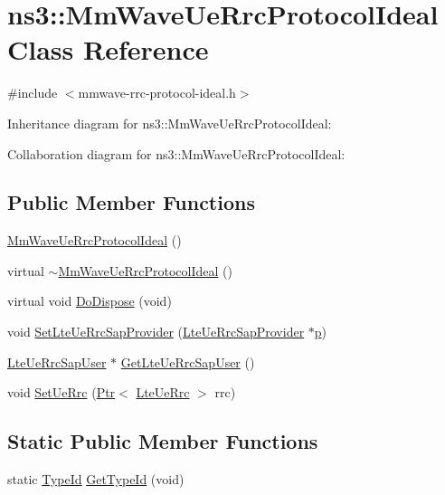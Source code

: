 \hypertarget{classns3_1_1MmWaveUeRrcProtocolIdeal}{}\section{ns3\+:\+:Mm\+Wave\+Ue\+Rrc\+Protocol\+Ideal Class Reference}
\label{classns3_1_1MmWaveUeRrcProtocolIdeal}


{\ttfamily \#include $<$mmwave-\/rrc-\/protocol-\/ideal.\+h$>$}



Inheritance diagram for ns3\+:\+:Mm\+Wave\+Ue\+Rrc\+Protocol\+Ideal\+:


Collaboration diagram for ns3\+:\+:Mm\+Wave\+Ue\+Rrc\+Protocol\+Ideal\+:
\subsection*{Public Member Functions}
\begin{DoxyCompactItemize}
\item 
\hyperlink{classns3_1_1MmWaveUeRrcProtocolIdeal_ae4988b5518f4a590e049f74e33978f2e}{Mm\+Wave\+Ue\+Rrc\+Protocol\+Ideal} ()
\item 
virtual \hyperlink{classns3_1_1MmWaveUeRrcProtocolIdeal_ade23c1f0a480c15e6c7a67045d7df137}{$\sim$\+Mm\+Wave\+Ue\+Rrc\+Protocol\+Ideal} ()
\item 
virtual void \hyperlink{classns3_1_1MmWaveUeRrcProtocolIdeal_a11bd9aac149c2f0d37e440b7628fa943}{Do\+Dispose} (void)
\item 
void \hyperlink{classns3_1_1MmWaveUeRrcProtocolIdeal_a6aed05cc60fc94e70db59b70a1a9e59e}{Set\+Lte\+Ue\+Rrc\+Sap\+Provider} (\hyperlink{classns3_1_1LteUeRrcSapProvider}{Lte\+Ue\+Rrc\+Sap\+Provider} $\ast$\hyperlink{lte__link__budget__x2__handover__measures_8m_ac9de518908a968428863f829398a4e62}{p})
\item 
\hyperlink{classns3_1_1LteUeRrcSapUser}{Lte\+Ue\+Rrc\+Sap\+User} $\ast$ \hyperlink{classns3_1_1MmWaveUeRrcProtocolIdeal_aef2a01aa68122ab82982b7ab14f01b83}{Get\+Lte\+Ue\+Rrc\+Sap\+User} ()
\item 
void \hyperlink{classns3_1_1MmWaveUeRrcProtocolIdeal_add9fb949c7977e039885d67645cc78f3}{Set\+Ue\+Rrc} (\hyperlink{classns3_1_1Ptr}{Ptr}$<$ \hyperlink{classns3_1_1LteUeRrc}{Lte\+Ue\+Rrc} $>$ rrc)
\end{DoxyCompactItemize}
\subsection*{Static Public Member Functions}
\begin{DoxyCompactItemize}
\item 
static \hyperlink{classns3_1_1TypeId}{Type\+Id} \hyperlink{classns3_1_1MmWaveUeRrcProtocolIdeal_a271610b4d68d9fb0b80a8e753b2a5771}{Get\+Type\+Id} (void)
\end{DoxyCompactItemize}
